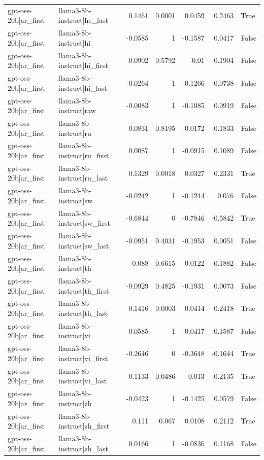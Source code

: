 \begin{table}
\begin{tabular}{l l r r r r l}
gpt-oss-20b|ar_first & llama3-8b-instruct|he_last & 0.1461 & 0.0001 & 0.0459 & 0.2463 & True \\
gpt-oss-20b|ar_first & llama3-8b-instruct|hi & -0.0585 & 1 & -0.1587 & 0.0417 & False \\
gpt-oss-20b|ar_first & llama3-8b-instruct|hi_first & 0.0902 & 0.5792 & -0.01 & 0.1904 & False \\
gpt-oss-20b|ar_first & llama3-8b-instruct|hi_last & -0.0264 & 1 & -0.1266 & 0.0738 & False \\
gpt-oss-20b|ar_first & llama3-8b-instruct|raw & -0.0083 & 1 & -0.1085 & 0.0919 & False \\
gpt-oss-20b|ar_first & llama3-8b-instruct|ru & 0.0831 & 0.8195 & -0.0172 & 0.1833 & False \\
gpt-oss-20b|ar_first & llama3-8b-instruct|ru_first & 0.0087 & 1 & -0.0915 & 0.1089 & False \\
gpt-oss-20b|ar_first & llama3-8b-instruct|ru_last & 0.1329 & 0.0018 & 0.0327 & 0.2331 & True \\
gpt-oss-20b|ar_first & llama3-8b-instruct|sw & -0.0242 & 1 & -0.1244 & 0.076 & False \\
gpt-oss-20b|ar_first & llama3-8b-instruct|sw_first & -0.6844 & 0 & -0.7846 & -0.5842 & True \\
gpt-oss-20b|ar_first & llama3-8b-instruct|sw_last & -0.0951 & 0.4031 & -0.1953 & 0.0051 & False \\
gpt-oss-20b|ar_first & llama3-8b-instruct|th & 0.088 & 0.6615 & -0.0122 & 0.1882 & False \\
gpt-oss-20b|ar_first & llama3-8b-instruct|th_first & -0.0929 & 0.4825 & -0.1931 & 0.0073 & False \\
gpt-oss-20b|ar_first & llama3-8b-instruct|th_last & 0.1416 & 0.0003 & 0.0414 & 0.2418 & True \\
gpt-oss-20b|ar_first & llama3-8b-instruct|vi & 0.0585 & 1 & -0.0417 & 0.1587 & False \\
gpt-oss-20b|ar_first & llama3-8b-instruct|vi_first & -0.2646 & 0 & -0.3648 & -0.1644 & True \\
gpt-oss-20b|ar_first & llama3-8b-instruct|vi_last & 0.1133 & 0.0486 & 0.013 & 0.2135 & True \\
gpt-oss-20b|ar_first & llama3-8b-instruct|zh & -0.0423 & 1 & -0.1425 & 0.0579 & False \\
gpt-oss-20b|ar_first & llama3-8b-instruct|zh_first & 0.111 & 0.067 & 0.0108 & 0.2112 & True \\
gpt-oss-20b|ar_first & llama3-8b-instruct|zh_last & 0.0166 & 1 & -0.0836 & 0.1168 & False \\

\end{tabular}
\end{table}
